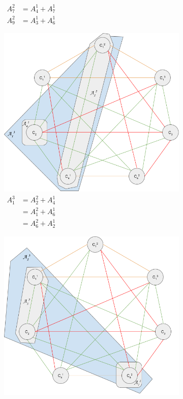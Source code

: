 \begin{figure}[h]
\begin{subfigure}[b]{\sfwidth}
    \caption[caption]{$\begin{aligned}
              A_7^2 &= A_4^1 + A_7^1\\
              A_9^2 &= A_3^1 + A_6^1
             \end{aligned}$}
  \end{subfigure}
  \begin{subfigure}[b]{\sfwidth}
    \includegraphics[width=\textwidth]{img/split-3-class_1.png}
    \caption[caption]{$\begin{aligned}
              A_1^3 &= A_2^2 + A_4^1\\
                    &= A_1^2 + A_6^1\\
                    &= A_6^2 + A_2^1
              \end{aligned}$}
  \end{subfigure}
  \begin{subfigure}[b]{\sfwidth}
    \includegraphics[width=\textwidth]{img/split-3-class_2.png}

\end{subfigure}
\end{figure}
